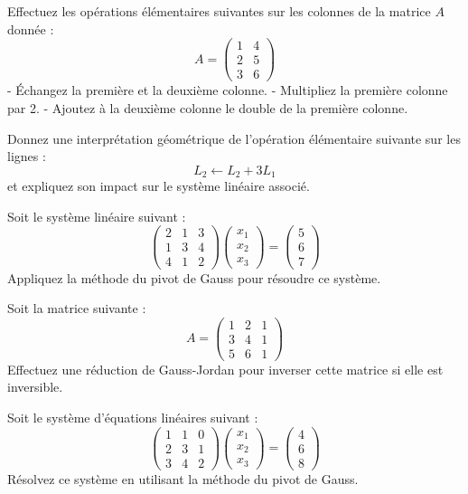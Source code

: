 \begin{exercice}
Effectuez les opérations élémentaires suivantes sur les colonnes de la matrice \( A \) donnée :
\[
A = \begin{pmatrix}
1 & 4 \\
2 & 5 \\
3 & 6
\end{pmatrix}
\]
- Échangez la première et la deuxième colonne.
- Multipliez la première colonne par 2.
- Ajoutez à la deuxième colonne le double de la première colonne.
\end{exercice}

\begin{exercice}
Donnez une interprétation géométrique de l'opération élémentaire suivante sur les lignes :
\[
L_2 \leftarrow L_2 + 3L_1
\]
et expliquez son impact sur le système linéaire associé.
\end{exercice}

\begin{exercice}
Soit le système linéaire suivant :
\[
\begin{pmatrix}
2 & 1 & 3 \\
1 & 3 & 4 \\
4 & 1 & 2
\end{pmatrix} 
\begin{pmatrix}
x_1 \\
x_2 \\
x_3
\end{pmatrix} = 
\begin{pmatrix}
5 \\
6 \\
7
\end{pmatrix}
\]
Appliquez la méthode du pivot de Gauss pour résoudre ce système.
\end{exercice}

\begin{exercice}
Soit la matrice suivante :
\[
A = \begin{pmatrix}
1 & 2 & 1 \\
3 & 4 & 1 \\
5 & 6 & 1
\end{pmatrix}
\]
Effectuez une réduction de Gauss-Jordan pour inverser cette matrice si elle est inversible.
\end{exercice}

\begin{exercice}
Soit le système d'équations linéaires suivant :
\[
\begin{pmatrix}
1 & 1 & 0 \\
2 & 3 & 1 \\
3 & 4 & 2
\end{pmatrix}
\begin{pmatrix}
x_1 \\
x_2 \\
x_3
\end{pmatrix} = 
\begin{pmatrix}
4 \\
6 \\
8
\end{pmatrix}
\]
Résolvez ce système en utilisant la méthode du pivot de Gauss.
\end{exercice}


